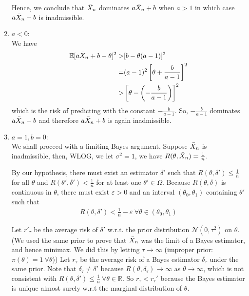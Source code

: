 \begin{example}
\begin{enumerate}[{Case} 1]
        Hence, we conclude that $\Bar{X}_n$ dominates $a\Bar{X}_n+b$ 
        when $a>1$ in which case $a\Bar{X}_n+b$ is inadmissible.

        \item $a<0$:\\
        We have 
        \begin{align}
            \mathbb{E}[a\Bar{X}_n+b-\theta]^2
            >& [b-\theta(a-1)]^2\\
            =& (a-1)^2\left[\theta+\frac{b}{a-1}\right]^2\\
            >& \left[\theta-\left(-\frac{b}{a-1}\right)\right]^2
        \end{align}
        which is the risk of predicting with the constant $-\frac{b}{a-1}$.
        So, $-\frac{b}{a-1}$ dominates $a\Bar{X}_n+b$ and therefore $a\Bar{X}_n+b$ is again inadmissible.

        \item $a=1,b=0$:\\
        We shall proceed with a limiting Bayes argument.
        Suppose $\Bar{X}_n$ is inadmissible, then, WLOG,
        we let $\sigma^2=1$, we have $R(\theta,\Bar{X}_n)=\frac{1}{n}$.

        By our hypothesis, there must exist an estimator $\delta'$ such that
        $R(\theta,\delta')\leq\frac{1}{n}$ for all $\theta$ and 
        $R(\theta',\delta')<\frac{1}{n}$ for at least one $\theta'\in\Omega$.
        Because $R(\theta,\delta)$ is continuous in $\theta$, 
        there must exist $\varepsilon>0$ and an interval $(\theta_0,\theta_1)$ containing $\theta'$ such that
        \begin{gather}
            R(\theta,\delta')<\frac{1}{n}-\varepsilon~\forall{\theta}\in(\theta_0,\theta_1)\label{eq:caseadmiss2}
        \end{gather}

        Let $r'_\tau$ be the average risk of $\delta'$ w.r.t. the prior distribution $\mathcal{N}(0,\tau^2)$ on $\theta$.
        (We used the same prior to prove that $\Bar{X}_n$ was the limit of a Bayes estimator,
        and hence minimax.
        We did this by letting $\tau\to\infty$ (improper prior: $\pi(\theta)=1~\forall{\theta}$))
        Let $r_\tau$ be the average risk of a Bayes estimator $\delta_\tau$ under the same prior.
        Note that $\delta_\tau\neq\delta'$ because $R(\theta,\delta_\tau)\to\infty$ as $\theta\to\infty$,
        which is not consistent with $R(\theta,\delta')\leq\frac{1}{n}~\forall{\theta}\in\mathbb{R}$.
        So $r_\tau<r_\tau'$ because the Bayes estimator is unique almost surely w.r.t the marginal distribution of $\theta$.


\end{enumerate}
\end{example}
